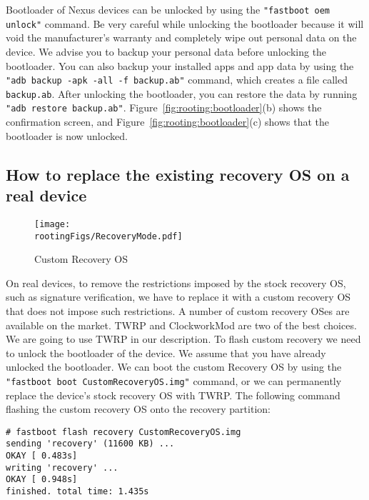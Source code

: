 Bootloader of Nexus devices can be unlocked by using the 
\texttt{"fastboot oem unlock"} command. 
Be very careful while unlocking the bootloader because it
will void the manufacturer's warranty and completely wipe out 
personal data on the device. We advise you to backup your personal data before
unlocking the bootloader. You can also backup your installed apps
and app data by using the \texttt{"adb backup -apk -all -f backup.ab"}
command, which creates a file called \texttt{backup.ab}. 
After unlocking the bootloader, you can restore the data by running 
\texttt{"adb restore backup.ab"}. 
Figure~\ref{fig:rooting:bootloader}(b) shows the confirmation screen, and 
Figure~\ref{fig:rooting:bootloader}(c) shows that the bootloader is now
unlocked. 




\subsection{How to replace the existing recovery OS on a real device}


\begin{figure}[htb]
	\begin{center}
		\texttt{[image: \\rootingFigs/RecoveryMode.pdf]}
	\end{center}
	\caption{Custom Recovery OS}
	\label{fig:root:customRecoveryMode}
\end{figure}
 

On real devices, to remove the restrictions imposed by the stock
recovery OS, such as signature verification, we have to replace it with 
a custom recovery OS that does not impose such restrictions. 
A number of custom recovery OSes are available on the market. TWRP and
ClockworkMod are two of the best choices. 
We are going to use TWRP in our description. 
To flash custom recovery we need to unlock the
bootloader of the device. We assume that you have already unlocked the
bootloader. We can boot the custom Recovery OS by using
the \texttt{"fastboot boot CustomRecoveryOS.img"} command, or we can
permanently replace the device's stock recovery OS with TWRP. The following 
command flashing the custom recovery OS onto the recovery partition:


\begin{lstlisting}[frame=single, caption={}, label=label]
# fastboot flash recovery CustomRecoveryOS.img
sending 'recovery' (11600 KB) ...
OKAY [ 0.483s]
writing 'recovery' ...
OKAY [ 0.948s]
finished. total time: 1.435s
\end{lstlisting}

